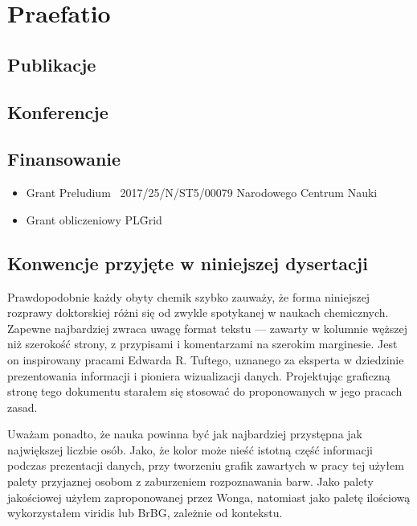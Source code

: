 \chapter{Praefatio}

\section{Publikacje}

\section{Konferencje}

\section{Finansowanie}

\begin{itemize}
  \item Grant Preludium \textnumero~2017/25/N/ST5/00079 Narodowego Centrum Nauki
  \item Grant obliczeniowy PL\=Grid
\end{itemize}


\section{Konwencje przyjęte w niniejszej dysertacji}

Prawdopodobnie każdy obyty chemik szybko zauważy, że forma niniejszej rozprawy doktorskiej różni się od zwykle spotykanej w naukach chemicznych.
Zapewne najbardziej zwraca uwagę format tekstu --- zawarty w kolumnie węższej niż szerokość strony, z przypisami i komentarzami na szerokim marginesie.
Jest on inspirowany pracami\cite{Tufte2001,Tufte1990,Tufte1997,Tufte2006} Edwarda R. Tuftego,
uznanego za eksperta w dziedzinie prezentowania informacji i pioniera wizualizacji danych\cite{Yaffa2011}.
Projektując graficzną stronę tego dokumentu starałem się stosować do proponowanych w jego pracach zasad.

Uważam ponadto, że nauka powinna być jak najbardziej przystępna jak największej liczbie osób.
Jako, że kolor może nieść istotną część informacji podczas prezentacji danych,
przy tworzeniu grafik zawartych w pracy tej użyłem palety przyjaznej osobom z zaburzeniem rozpoznawania barw.
Jako palety jakościowej użyłem zaproponowanej przez Wonga\cite{wong11},
natomiast jako paletę ilościową wykorzystałem viridis\cite{Smith2015} lub BrBG, zależnie od kontekstu.

